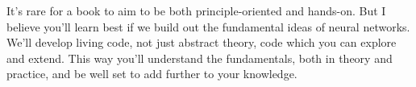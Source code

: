 \documentclass[a4paper,twoside,10pt]{book}
\begin{document}
It's rare for a book to aim to be both principle-oriented and hands-on. But I believe you'll learn best if we build out the fundamental ideas of neural networks. We'll develop living code, not just abstract theory, code which you can explore and extend. This way you'll understand the fundamentals, both in theory and practice, and be well set to add further to your knowledge.
\end{document}

